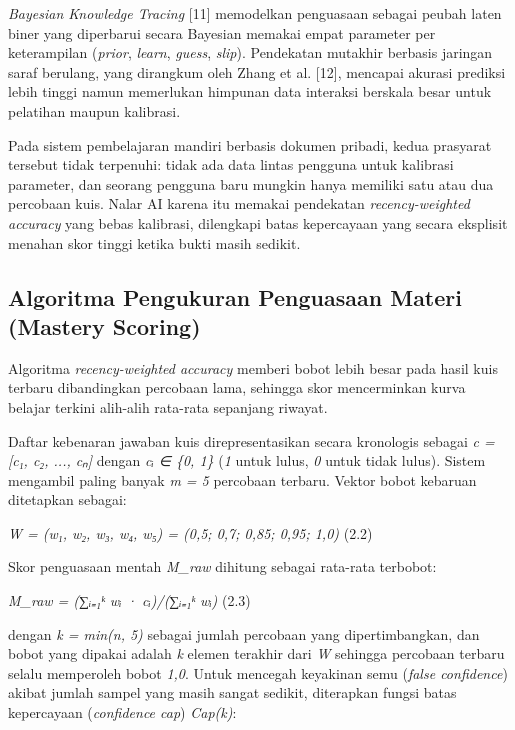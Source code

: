\documentclass[12pt,a4paper]{article}
\begin{document}
\textit{Bayesian Knowledge Tracing} {[}11{]} memodelkan penguasaan sebagai peubah laten biner yang diperbarui secara Bayesian memakai empat parameter per keterampilan (\textit{prior}, \textit{learn}, \textit{guess}, \textit{slip}). Pendekatan mutakhir berbasis jaringan saraf berulang, yang dirangkum oleh Zhang et al. {[}12{]}, mencapai akurasi prediksi lebih tinggi namun memerlukan himpunan data interaksi berskala besar untuk pelatihan maupun kalibrasi.



Pada sistem pembelajaran mandiri berbasis dokumen pribadi, kedua prasyarat tersebut tidak terpenuhi: tidak ada data lintas pengguna untuk kalibrasi parameter, dan seorang pengguna baru mungkin hanya memiliki satu atau dua percobaan kuis. Nalar AI karena itu memakai pendekatan \textit{recency-weighted accuracy} yang bebas kalibrasi, dilengkapi batas kepercayaan yang secara eksplisit menahan skor tinggi ketika bukti masih sedikit.



\subsection*{Algoritma Pengukuran Penguasaan Materi (Mastery Scoring)}

Algoritma \textit{recency-weighted accuracy} memberi bobot lebih besar pada hasil kuis terbaru dibandingkan percobaan lama, sehingga skor mencerminkan kurva belajar terkini alih-alih rata-rata sepanjang riwayat.



Daftar kebenaran jawaban kuis direpresentasikan secara kronologis sebagai \textit{c = {[}c₁, c₂, ..., cₙ{]}} dengan \textit{cᵢ ∈ \{0, 1\}} (\textit{1} untuk lulus, \textit{0} untuk tidak lulus). Sistem mengambil paling banyak \textit{m = 5} percobaan terbaru. Vektor bobot kebaruan ditetapkan sebagai:



\textit{W = (w₁, w₂, w₃, w₄, w₅) = (0,5; 0,7; 0,85; 0,95; 1,0)}	(2.2)



Skor penguasaan mentah \textit{M\_raw} dihitung sebagai rata-rata terbobot:



\textit{M\_raw = (∑ᵢ₌₁ᵏ wᵢ · cᵢ)/(∑ᵢ₌₁ᵏ wᵢ)}	(2.3)



dengan \textit{k = min(n, 5)} sebagai jumlah percobaan yang dipertimbangkan, dan bobot yang dipakai adalah \textit{k} elemen terakhir dari \textit{W} sehingga percobaan terbaru selalu memperoleh bobot \textit{1,0}. Untuk mencegah keyakinan semu (\textit{false confidence}) akibat jumlah sampel yang masih sangat sedikit, diterapkan fungsi batas kepercayaan (\textit{confidence cap}) \textit{Cap(k)}:
\end{document}
